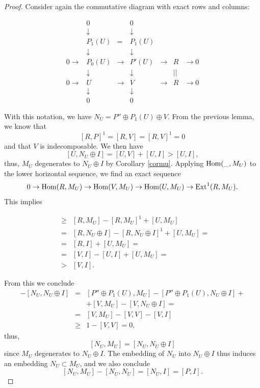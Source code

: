 \documentclass{amsart}
\numberwithin{equation}{section}
\theoremstyle{remark}
\begin{document}
\begin{proof} Consider again the commutative diagram with exact rows and columns:

$$\begin{array}{ccccccc}
&0&&0&&&\\ &\downarrow&&\downarrow&&&\\ &P_1(U)&=&P_1(U)&&&\\
&\downarrow&&\downarrow&&&\\
0\rightarrow&P_0(U)&\rightarrow&P'(U)&\rightarrow&R&\rightarrow 0\\
&\downarrow&&\downarrow&&||&\\
0\rightarrow&U&\rightarrow&V&\rightarrow&R&\rightarrow 0\\
&\downarrow&&\downarrow&&&\\ &0&&0&&&\end{array}$$

With this notation, we have $N_U=P''\oplus P_1(U)\oplus V$. From the previous lemma, we know that $$[R,P]^1=[R,V]=[R,V]^1=0$$ and that $V$ is indecomposable.  We then have
$$[U,N_U\oplus I]=[U,V]+[U,I]>[U,I],$$
thus, $M_U$ degenerates to $N_U\oplus I$ by Corollary \ref{cormu}. 
Applying ${\rm Hom}(\_,M_U)$ to the lower horizontal sequence, we find an exact sequence
$$0\rightarrow{\rm Hom}(R,M_U)\rightarrow {\rm Hom}(V,M_U)\rightarrow{\rm Hom}(U,M_U)\rightarrow {\rm Ext}^1(R,M_U).$$
This implies

\begin{eqnarray*}[V,M_U]&\geq& [R,M_U]-[R,M_U]^1+[U,M_U]\\
&=&[R,N_U\oplus I]-[R,N_U\oplus I]^1+[U,M_U]=\\
&=&[R,I]+[U,M_U]=\\
&=&[V,I]-[U,I]+[U,M_U]=\\
&>&[V,I].
\end{eqnarray*}

From this we conclude
\begin{eqnarray*}[N_U,M_U]-[N_U,N_U\oplus I]
&=&[P''\oplus P_1(U),M_U]-[P''\oplus P_1(U),N_U\oplus I]+\\
&&+[V,M_U]-[V,N_U\oplus I]=\\
&=&[V,M_U]-[V,V]-[V,I]\\
&\geq&1-[V,V]=0,\end{eqnarray*}
thus, $$[N_U,M_U]=[N_U,N_U\oplus I]$$ since $M_U$ degenerates to $N_U\oplus I$. 
The embedding of $N_U$ into $N_U\oplus I$ thus induces an embedding $N_U\subset M_U$, and we also conclude
$$[N_U,M_U]-[N_U,N_U]=[N_U,I]=[P,I].$$
\end{proof}
\end{document}
